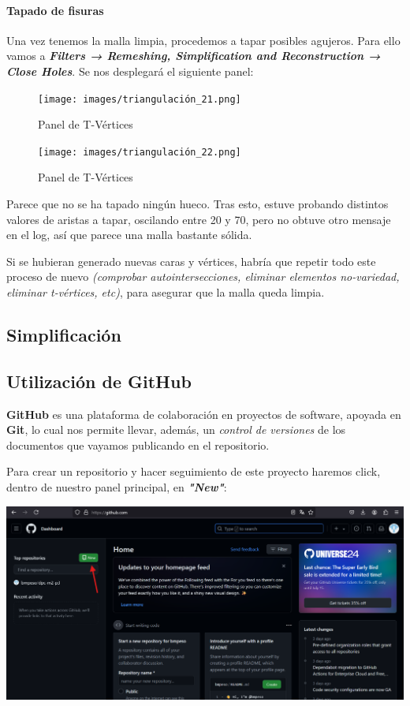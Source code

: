 \documentclass[options]{article}
\begin{document}
\paragraph{Tapado de fisuras}

Una vez tenemos la malla limpia, procedemos a tapar posibles agujeros. Para ello vamos a \textbf{\textit{Filters → Remeshing, Simplification and Reconstruction → Close Holes}}. Se nos desplegará el siguiente panel:

\begin{figure}[H]
    \centering
    \texttt{[image: images/triangulación\_21.png]}
    \caption{Panel de T-Vértices}
\end{figure}

\begin{figure}[H]
    \centering
    \texttt{[image: images/triangulación\_22.png]}
    \caption{Panel de T-Vértices}
\end{figure}

Parece que no se ha tapado ningún hueco. Tras esto, estuve probando distintos valores de aristas a tapar, oscilando entre 20 y 70, pero no obtuve otro mensaje en el log, así que parece una malla bastante sólida.

Si se hubieran generado nuevas caras y vértices, habría que repetir todo este proceso de nuevo \textit{(comprobar autointersecciones, eliminar elementos no-variedad, eliminar t-vértices, etc)}, para asegurar que la malla queda limpia.

\subsection{Simplificación}

\subsection{Utilización de GitHub}

\textbf{GitHub} es una plataforma de colaboración en proyectos de software, apoyada en \textbf{Git}, lo cual nos permite llevar, además, un \textit{control de versiones} de los documentos que vayamos publicando en el repositorio. 


Para crear un repositorio y hacer seguimiento de este proyecto haremos click, dentro de nuestro panel principal, en \textbf{\textit{"New"}}:

\begin{center}
    \includegraphics[scale=0.35]{images/github_01.png}
\end{center}
\end{document}
